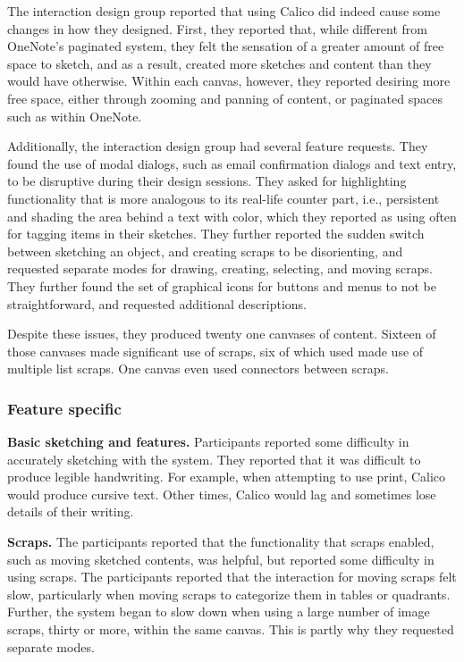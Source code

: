 The interaction design group reported that using Calico did indeed cause some changes in how they designed. First, they reported that, while different from OneNote's paginated system, they felt the sensation of a greater amount of free space to sketch, and as a result, created more sketches and content than they would have otherwise. Within each canvas, however, they reported desiring more free space, either through zooming and panning of content, or paginated spaces such as within OneNote. 

Additionally, the interaction design group had several feature requests. They found the use of modal dialogs, such as email confirmation dialogs and text entry, to be disruptive during their design sessions. They asked for highlighting functionality that is more analogous to its real-life counter part, i.e., persistent and shading the area behind a text with color, which they reported as using often for tagging items in their sketches. They further reported the sudden switch between sketching an object, and creating scraps to be disorienting, and requested separate modes for drawing, creating, selecting, and moving scraps. They further found the set of graphical icons for buttons and menus to not be straightforward, and requested additional descriptions.

Despite these issues, they produced twenty one canvases of content. Sixteen of those canvases made significant use of scraps, six of which used made use of multiple list scraps. One canvas even used connectors between scraps.

\subsubsection{Feature specific}

\textbf{Basic sketching and features.} Participants reported some difficulty in accurately sketching with the system. They reported that it was difficult to produce legible handwriting. For example, when attempting to use print, Calico would produce cursive text. Other times, Calico would lag and sometimes lose details of their writing.

\textbf{Scraps.} The participants reported that the functionality that scraps enabled, such as moving sketched contents, was helpful, but reported some difficulty in using scraps. The participants reported that the interaction for moving scraps felt slow, particularly when moving scraps to categorize them in tables or quadrants. Further, the system began to slow down when using a large number of image scraps, thirty or more, within the same canvas. This is partly why they requested separate modes.

